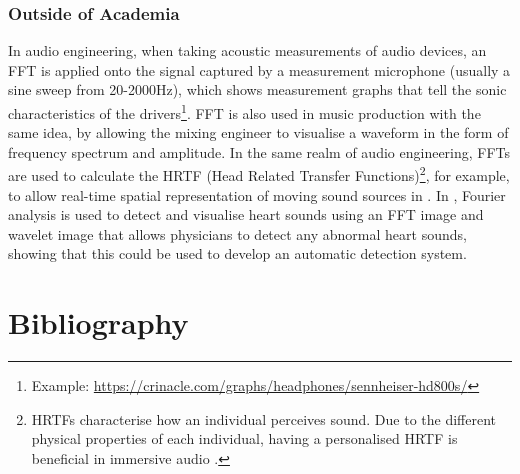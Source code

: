 \documentclass[a4paper, 10pt, conference]{ieeeconf}      %
\begin{document}
\subsubsection{Outside of Academia} %
In audio engineering, when taking acoustic measurements of audio devices, an FFT is applied onto the signal captured by a measurement microphone (usually a sine sweep from 20-2000Hz), which shows measurement graphs that tell the sonic characteristics of the drivers\footnote{Example: \url{https://crinacle.com/graphs/headphones/sennheiser-hd800s/}}. FFT is also used in music production with the same idea, by allowing the mixing engineer to visualise a waveform in the form of frequency spectrum and amplitude. In the same realm of audio engineering, FFTs are used to calculate the HRTF (Head Related Transfer Functions)\footnote{HRTFs characterise how an individual perceives sound. Due to the different physical properties of each individual, having a personalised HRTF is beneficial in immersive audio \cite{Oehler2023}.}, for example, to allow real-time spatial representation of moving sound sources in \cite{Tsakostas2007}.  In \cite{Nogata2012}, Fourier analysis is used to detect and visualise heart sounds using an FFT image and wavelet image that allows physicians to detect any abnormal heart sounds, showing that this could be used to develop an automatic detection system. 

\newpage
\section{Bibliography}


\end{document}
